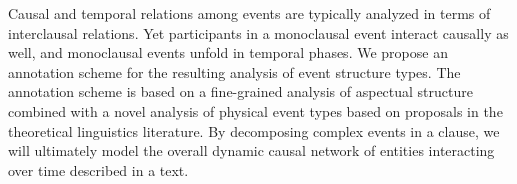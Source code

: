 Causal and temporal relations among events are typically analyzed in terms of interclausal relations. Yet participants in a monoclausal event interact causally as well, and monoclausal events unfold in temporal phases. We propose an annotation scheme for the resulting analysis of event structure types. The annotation scheme is based on a fine-grained analysis of aspectual structure combined with a novel analysis of physical event types based on proposals in the theoretical linguistics literature. By decomposing complex events in a clause, we will ultimately model the overall dynamic causal network of entities interacting over time described in a text.
